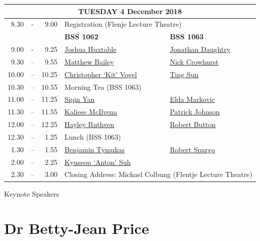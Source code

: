 \documentclass[twoside,14pt,a4paper,notitlepage]{memoir}
\begin{document}
\pagebreak
\vspace*{0cm}
\begin{center}
\begin{tabular}{rcr|p{3.6cm}|p{3.6cm}}
\multicolumn{5}{c}{{\large TUESDAY 4 December 2018}} \\ \hline
8.30 & - & 9.00 & \multicolumn{2}{l}{Registration (Flenje Lecture Theatre)} \\ \hline
 & & & \textbf{BSS 1062} & \textbf{BSS 1063} \\ \hline
9.00 & - & 9.25 &
 \hyperref[aut:huxtable]{Joshua Huxtable} &
 \hyperref[aut:daughtry]{Jonathan Daughtry} \\ \hline
9.30 & – & 9.55 &
 \hyperref[aut:bailey]{Matthew Bailey} &
 \hyperref[aut:crowhurst]{Nick Crowhurst} \\ \hline
10.00 & – & 10.25 &
\hyperref[aut:vogel]{Christopher `Kit' Vogel} &
\hyperref[aut:sun]{Ting Sun} \\ \hline
10.30 & – & 10.55 & \multicolumn{2}{l}{Morning Tea (BSS 1063)} \\ \hline
11.00 & – & 11.25 & 
 \hyperref[aut:yan]{Siqin Yan} &
 \hyperref[aut:markovic]{Elda Markovic} \\ \hline
11.30 & – & 11.55 &
 \hyperref[aut:mcilvena]{Kaliese McIlvena} &
 \hyperref[aut:johnson]{Patrick Johnson} \\ \hline
12.00 & – & 12.25 &
 \hyperref[aut:ruthven]{Hayley Ruthven} &
 \hyperref[aut:button]{Robert Button} \\ \hline
12.30 & – & 1.25 & \multicolumn{2}{l}{Lunch (BSS 1063)} \\ \hline
1.30 & – & 1.55 &
 \hyperref[aut:tymukas]{Benjamin Tymukas} &
 \hyperref[aut:spargo]{Robert Spargo} \\ \hline
2.00 & – & 2.25 & 
\hyperref[aut:suh]{Kyuseop `Anton' Suh} & \\ \hline
2.30 & – & 3.00 & \multicolumn{2}{l}{Closing Address: Michael Colbung (Flentje Lecture Theatre)} \\ \hline
\end{tabular}
\end{center}


% 



\clearpage{}
\vspace*{2cm}
{\Huge Keynote Speakers}
\vspace{2cm}

\section*{Dr Betty-Jean Price}
\end{document}
